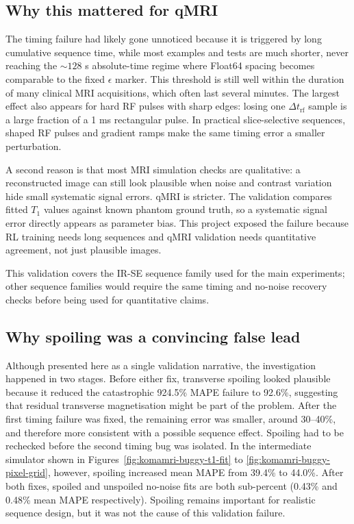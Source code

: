 \subsection{Why this mattered for qMRI}
\label{subsec:komamri-why-qmri}

The timing failure had likely gone unnoticed because it is triggered by long cumulative
sequence time, while most examples and tests are much shorter, never reaching
the $\sim128$ s absolute-time regime where Float64 spacing becomes comparable
to the fixed $\epsilon$ marker. This threshold is still well within the
duration of many clinical MRI acquisitions, which often last several minutes.
The largest effect also appears for hard RF pulses with sharp edges: losing one
$\Delta t_\mathrm{rf}$ sample is a large fraction of a 1 ms rectangular pulse.
In practical slice-selective sequences, shaped RF pulses and gradient ramps
make the same timing error a smaller perturbation.

A second reason is that most MRI simulation checks are qualitative: a
reconstructed image can still look plausible when noise and contrast variation
hide small systematic signal errors. qMRI is stricter. The validation compares
fitted $T_1$ values against known phantom ground truth, so a systematic signal
error directly appears as parameter bias. This project exposed the failure because
RL training needs long sequences and qMRI validation needs quantitative
agreement, not just plausible images.

This validation covers the IR-SE sequence family used for the main experiments;
other sequence families would require the same timing and no-noise recovery
checks before being used for quantitative claims.

\subsection{Why spoiling was a convincing false lead}
\label{subsec:komamri-spoiling-false-lead}

Although presented here as a single validation narrative, the investigation
happened in two stages. Before either fix, transverse spoiling looked plausible
because it reduced the catastrophic 924.5\% MAPE failure to 92.6\%, suggesting
that residual transverse magnetisation might be part of the problem. After the
first timing failure was fixed, the remaining error was smaller, around 30--40\%, and
therefore more consistent with a possible sequence effect. Spoiling had to be
rechecked before the second timing bug was isolated. In the intermediate
simulator shown in Figures~\ref{fig:komamri-buggy-t1-fit} to
\ref{fig:komamri-buggy-pixel-grid}, however, spoiling increased mean MAPE from
39.4\% to 44.0\%. After both fixes, spoiled and unspoiled no-noise fits are
both sub-percent (0.43\% and 0.48\% mean MAPE respectively). Spoiling remains
important for realistic sequence design, but it was not the cause of this
validation failure.

